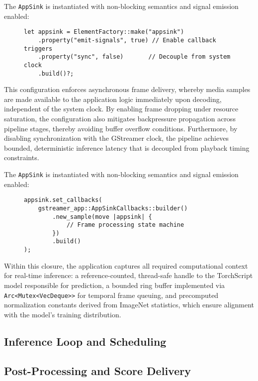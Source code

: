 The \texttt{AppSink} is instantiated with non-blocking semantics and signal emission enabled:

\begin{figure}[htbp]
\centering
\begin{verbatim}
let appsink = ElementFactory::make("appsink")
    .property("emit-signals", true) // Enable callback triggers
    .property("sync", false)       // Decouple from system clock
    .build()?;
\end{verbatim}
\label{lst:appsink_config}
\end{figure}

This configuration enforces asynchronous frame delivery, whereby media samples are made available to the application logic immediately upon decoding, independent of the system clock. By enabling frame dropping under resource saturation, the configuration also mitigates backpressure propagation across pipeline stages, thereby avoiding buffer overflow conditions. Furthermore, by disabling synchronization with the GStreamer clock, the pipeline achieves bounded, deterministic inference latency that is decoupled from playback timing constraints.

The \texttt{AppSink} is instantiated with non-blocking semantics and signal emission enabled:

\begin{figure}[htbp]
\centering
\begin{verbatim}
appsink.set_callbacks(
    gstreamer_app::AppSinkCallbacks::builder()
        .new_sample(move |appsink| {
            // Frame processing state machine
        })
        .build()
);
\end{verbatim}
\label{lst:appsink_callbacks}
\end{figure}

Within this closure, the application captures all required computational context for real-time inference: a reference-counted, thread-safe handle to the TorchScript model responsible for prediction, a bounded ring buffer implemented via \texttt{Arc<Mutex<VecDeque>>} for temporal frame queuing, and precomputed normalization constants derived from ImageNet statistics, which ensure alignment with the model’s training distribution.

\subsection{Inference Loop and Scheduling}

\subsection{Post-Processing and Score Delivery}
